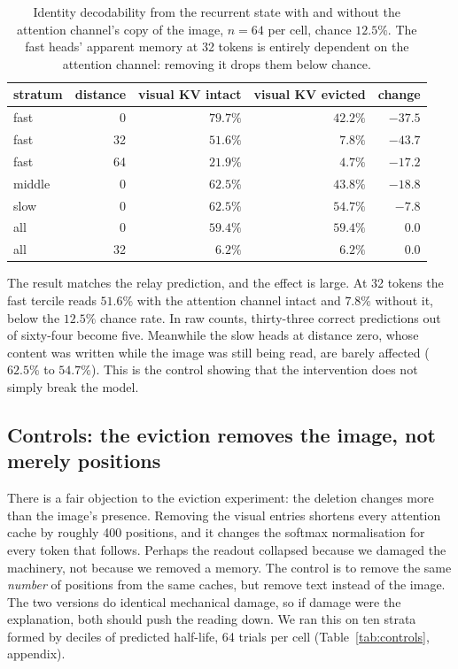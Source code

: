 \documentclass{article}
\begin{document}
\begin{table}[t]
\centering\small
\begin{tabular}{lrrrr}
\toprule
stratum & distance & visual KV intact & visual KV evicted & change \\
\midrule
fast   & 0  & $79.7\%$ & $42.2\%$ & $-37.5$ \\
fast   & 32 & $51.6\%$ & $\mathbf{7.8\%}$  & $-43.7$ \\
fast   & 64 & $21.9\%$ & $4.7\%$  & $-17.2$ \\
\addlinespace
middle & 0  & $62.5\%$ & $43.8\%$ & $-18.8$ \\
slow   & 0  & $62.5\%$ & $54.7\%$ & $-7.8$  \\
\addlinespace
all    & 0  & $59.4\%$ & $59.4\%$ & $0.0$   \\
all    & 32 & $6.2\%$  & $6.2\%$  & $0.0$   \\
\bottomrule
\end{tabular}
\caption{Identity decodability from the recurrent state with and without the
attention channel's copy of the image, $n = 64$ per cell, chance $12.5\%$. The
fast heads' apparent memory at 32 tokens is entirely dependent on the attention
channel: removing it drops them below chance.}
\label{tab:relay}
\end{table}

The result matches the relay prediction, and the effect is large. At 32 tokens
the fast tercile reads $51.6\%$ with the attention channel intact and $7.8\%$
without it, below the $12.5\%$ chance rate. In raw counts, thirty-three
correct predictions out of sixty-four become five. Meanwhile the slow heads at
distance zero, whose content was written while the image was still being read,
are barely affected ($62.5\%$ to $54.7\%$). This is the control showing that
the intervention does not simply break the model.

\subsection{Controls: the eviction removes the image, not merely positions}
\label{sec:controls}

There is a fair objection to the eviction experiment: the deletion changes
more than the image's presence. Removing the visual entries shortens every
attention cache by roughly 400 positions, and it changes the softmax
normalisation for every token that follows. Perhaps the readout collapsed
because we damaged the machinery, not because we removed a memory. The
control is to remove the same \emph{number} of positions from the same
caches, but remove text instead of the image. The two versions do identical
mechanical damage, so if damage were the explanation, both should push the
reading down. We ran this on ten strata formed by deciles of predicted
half-life, 64 trials per cell (Table~\ref{tab:controls}, appendix).
\end{document}
